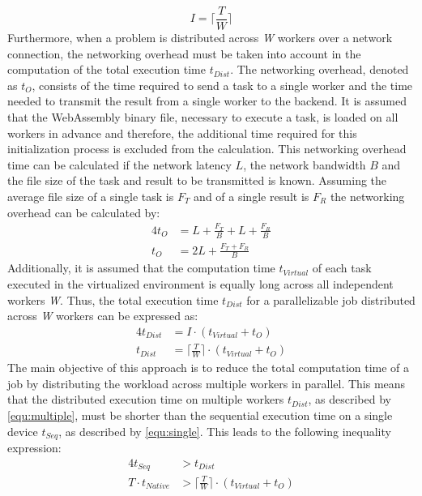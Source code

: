 \begin{equation}
  I = \bigg\lceil\frac{T}{W}\bigg\rceil
  \label{equ:frac}
\end{equation}
Furthermore, when a problem is distributed across \emph{W} workers over a network connection, the networking overhead must be taken into account in the computation of the total execution time $t_{Dist}$. The networking overhead, denoted as $t_{O}$, consists of the time required to send a task to a single worker and the time needed to transmit the result from a single worker to the backend. It is assumed that the WebAssembly binary file, necessary to execute a task, is loaded on all workers in advance and therefore, the additional time required for this initialization process is excluded from the calculation. This networking overhead time can be calculated if the network latency $L$, the network bandwidth $B$ and the file size of the task and result to be transmitted is known. Assuming the average file size of a single task is $F_{T}$ and of a single result is $F_{R}$ the networking overhead can be calculated by:
\begin{alignat}{4}
  t_{O} &= L + \frac{F_{T}}{B} + L + \frac{F_{R}}{B} \nonumber \\
  t_{O} &= 2L + \frac{F_{T} + F_{R}}{B}
  \label{equ:overhead}
\end{alignat}
Additionally, it is assumed that the computation time $t_{Virtual}$ of each task executed in the virtualized environment is equally long across all independent workers \emph{W}. Thus, the total execution time $t_{Dist}$ for a parallelizable job distributed across \emph{W} workers can be expressed as:
\begin{alignat}{4}
  t_{Dist} &= I \cdot (t_{Virtual} + t_{O}) \nonumber \\
  t_{Dist} &= \bigg\lceil\frac{T}{W}\bigg\rceil \cdot (t_{Virtual} + t_{O})
  \label{equ:multiple}
\end{alignat}
The main objective of this approach is to reduce the total computation time of a job by distributing the workload across multiple workers in parallel. This means that the distributed execution time on multiple workers $t_{Dist}$, as described by \eqref{equ:multiple}, must be shorter than the sequential execution time on a single device $t_{Seq}$, as described by \eqref{equ:single}. This leads to the following inequality expression:
\begin{alignat}{4}
  t_{Seq} &> t_{Dist} \nonumber \\
  T \cdot t_{Native} &> \bigg\lceil\frac{T}{W}\bigg\rceil \cdot (t_{Virtual} + t_{O})
  \label{equ:compare}
\end{alignat}
